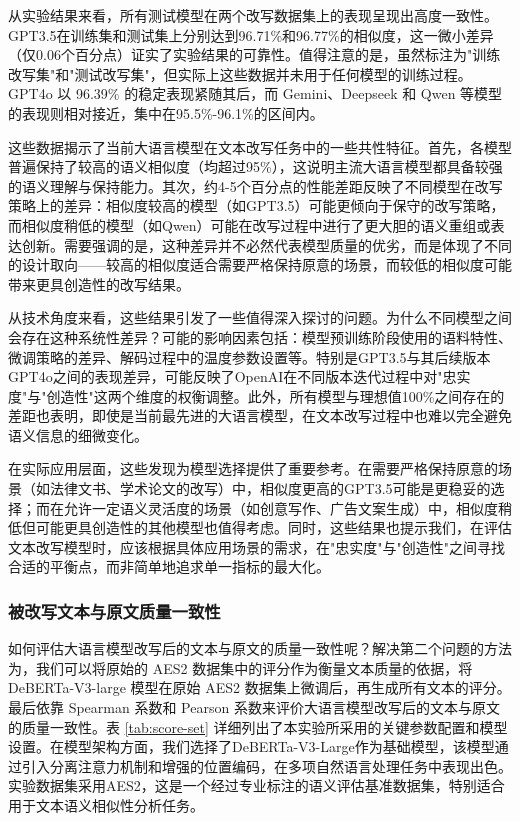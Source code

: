 从实验结果来看，所有测试模型在两个改写数据集上的表现呈现出高度一致性。GPT3.5在训练集和测试集上分别达到96.71\%和96.77\%的相似度，这一微小差异（仅0.06个百分点）证实了实验结果的可靠性。值得注意的是，虽然标注为"训练改写集"和"测试改写集"，但实际上这些数据并未用于任何模型的训练过程。GPT4o 以 96.39\% 的稳定表现紧随其后，而 Gemini、Deepseek 和 Qwen 等模型的表现则相对接近，集中在95.5\%-96.1\%的区间内。

这些数据揭示了当前大语言模型在文本改写任务中的一些共性特征。首先，各模型普遍保持了较高的语义相似度（均超过95\%），这说明主流大语言模型都具备较强的语义理解与保持能力。其次，约4-5个百分点的性能差距反映了不同模型在改写策略上的差异：相似度较高的模型（如GPT3.5）可能更倾向于保守的改写策略，而相似度稍低的模型（如Qwen）可能在改写过程中进行了更大胆的语义重组或表达创新。需要强调的是，这种差异并不必然代表模型质量的优劣，而是体现了不同的设计取向——较高的相似度适合需要严格保持原意的场景，而较低的相似度可能带来更具创造性的改写结果。

从技术角度来看，这些结果引发了一些值得深入探讨的问题。为什么不同模型之间会存在这种系统性差异？可能的影响因素包括：模型预训练阶段使用的语料特性、微调策略的差异、解码过程中的温度参数设置等。特别是GPT3.5与其后续版本GPT4o之间的表现差异，可能反映了OpenAI在不同版本迭代过程中对"忠实度"与"创造性"这两个维度的权衡调整。此外，所有模型与理想值100\%之间存在的差距也表明，即使是当前最先进的大语言模型，在文本改写过程中也难以完全避免语义信息的细微变化。

在实际应用层面，这些发现为模型选择提供了重要参考。在需要严格保持原意的场景（如法律文书、学术论文的改写）中，相似度更高的GPT3.5可能是更稳妥的选择；而在允许一定语义灵活度的场景（如创意写作、广告文案生成）中，相似度稍低但可能更具创造性的其他模型也值得考虑。同时，这些结果也提示我们，在评估文本改写模型时，应该根据具体应用场景的需求，在"忠实度"与"创造性"之间寻找合适的平衡点，而非简单地追求单一指标的最大化。

\subsubsection{被改写文本与原文质量一致性}

如何评估大语言模型改写后的文本与原文的质量一致性呢？解决第二个问题的方法为，我们可以将原始的 AES2 数据集中的评分作为衡量文本质量的依据，将 DeBERTa-V3-large 模型在原始 AES2 数据集上微调后，再生成所有文本的评分。最后依靠 Spearman 系数和 Pearson 系数来评价大语言模型改写后的文本与原文的质量一致性。表 \ref{tab:score-set} 详细列出了本实验所采用的关键参数配置和模型设置。在模型架构方面，我们选择了DeBERTa-V3-Large作为基础模型，该模型通过引入分离注意力机制和增强的位置编码，在多项自然语言处理任务中表现出色。实验数据集采用AES2，这是一个经过专业标注的语义评估基准数据集，特别适合用于文本语义相似性分析任务。

